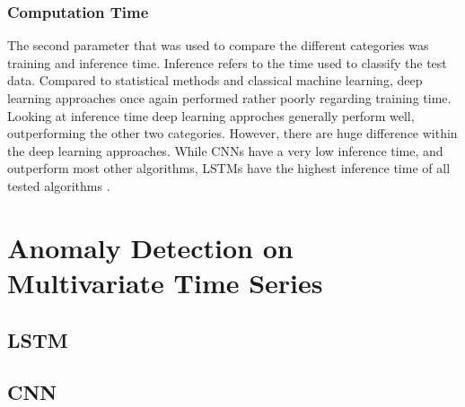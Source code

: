 \subsubsection{Computation Time}
The second parameter that was used to compare the different categories was training and inference time. Inference refers to the time used to classify the test data. Compared to statistical methods and classical machine learning, deep learning approaches once again performed rather poorly regarding training time. Looking at inference time deep learning approches generally perform well, outperforming the other two categories. However, there are huge difference within the deep learning approaches. While CNNs have a very low inference time, and outperform most other algorithms, LSTMs have the highest inference time of all tested algorithms \parencite{Braei2020}.  


\section{Anomaly Detection on Multivariate Time Series}

\subsection{LSTM}

\subsection{CNN}


